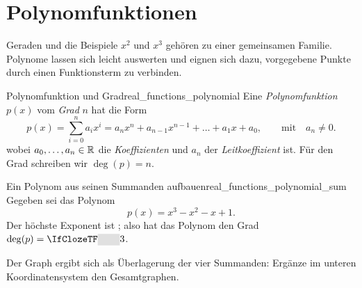 \section{Polynomfunktionen}
\label{sec:real_functions_polynomials}
Geraden und die Beispiele $x^2$ und $x^3$ gehören zu einer gemeinsamen
Familie. Polynome lassen sich leicht auswerten und eignen sich dazu,
vorgegebene Punkte durch einen Funktionsterm zu verbinden.

\par\noindent\begin{minipage}{\linewidth}
\begin{DefinitionBox}{Polynomfunktion und Grad}{real_functions_polynomial}
  Eine \emph{Polynomfunktion}  $p(x)$ vom \emph{Grad}
   $n$ hat die Form
  \[
    p(x)= \sum_{i=0}^{n}a_ix^i = a_nx^n+a_{n-1}x^{n-1}+\dots+a_1x+a_0,
    \qquad \text{mit} \quad a_n\ne0.
  \]
  wobei $a_0,\dots,a_n\in\mathbb{R}$ die \emph{Koeffizienten} 
  und $a_n$ der \emph{Leitkoeffizient}  ist.
  Für den Grad schreiben wir $\deg(p)=n$.
\end{DefinitionBox}


\begin{ExampleBox}[before skip=0.3\baselineskip]{Ein Polynom aus seinen Summanden aufbauen}{real_functions_polynomial_sum}
  Gegeben sei das Polynom 
  \[
    p(x)=x^3-x^2-x+1.
  \]
  Der höchste Exponent ist ; also hat das Polynom den Grad
  $\deg(p)=\Cloze{0.8cm}{3}$.

  Der Graph ergibt sich als Überlagerung der vier Summanden: 
  \IfClozeTF
    {Ergänze im unteren Koordinatensystem den Gesamtgraphen.}
    {}
  \par\medskip\noindent\centering
\end{ExampleBox}
\end{minipage}



